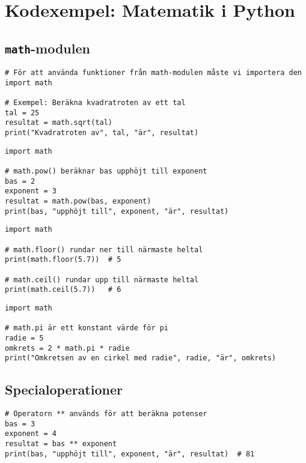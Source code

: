 \section{Kodexempel: Matematik i Python}
\label{examples:math}
\subsection*{\texttt{math}-modulen}

\begin{lstlisting}[title=Exempel 1: Importera math-modulen]
# För att använda funktioner från math-modulen måste vi importera den
import math

# Exempel: Beräkna kvadratroten av ett tal
tal = 25
resultat = math.sqrt(tal)
print("Kvadratroten av", tal, "är", resultat)
\end{lstlisting}

\begin{lstlisting}[title=Exempel 2: Exponentiering med \texttt{math.pow()}]
import math

# math.pow() beräknar bas upphöjt till exponent
bas = 2
exponent = 3
resultat = math.pow(bas, exponent)
print(bas, "upphöjt till", exponent, "är", resultat)
\end{lstlisting}

\begin{lstlisting}[title=Exempel 3: Heltalsavrundning med \texttt{math.floor()} och \texttt{math.ceil()}]
import math

# math.floor() rundar ner till närmaste heltal
print(math.floor(5.7))  # 5

# math.ceil() rundar upp till närmaste heltal
print(math.ceil(5.7))   # 6
\end{lstlisting}

\begin{lstlisting}[title=Exempel 4: Använda matematiska konstanter som \texttt{math.pi}]
import math

# math.pi är ett konstant värde för pi
radie = 5
omkrets = 2 * math.pi * radie
print("Omkretsen av en cirkel med radie", radie, "är", omkrets)
\end{lstlisting}

\subsection*{Specialoperationer}

\begin{lstlisting}[title=Exempel 5: Exponentiering med \texttt{**}]
# Operatorn ** används för att beräkna potenser
bas = 3
exponent = 4
resultat = bas ** exponent
print(bas, "upphöjt till", exponent, "är", resultat)  # 81
\end{lstlisting}

